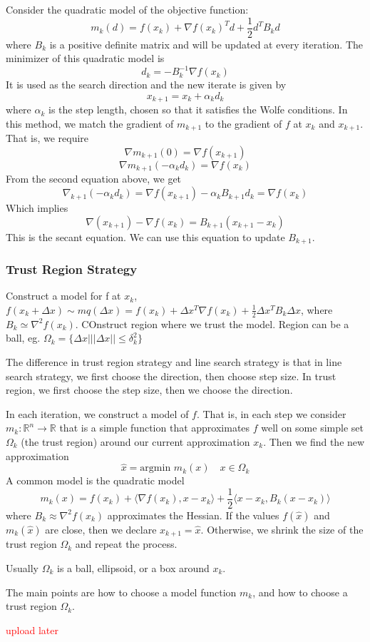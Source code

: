 Consider the quadratic model of the objective function:
$$m_k(d) = f(x_k) + \nabla f(x_k)^T d + \frac{1}{2} d^T B_k d$$
where $B_k$ is a positive definite matrix and will be updated at every iteration. The minimizer of this quadratic model is $$d_k = -B_k^{-1} \nabla f(x_k)$$
It is used as the search direction and the new iterate is given by $$x_{k+1} = x_k + \alpha_k d_k$$
where $\alpha_k$ is the step length, chosen so that it satisfies the Wolfe conditions. In this method, we match the gradient of $m_{k+1}$ to the gradient of $f$ at $x_k$ and $x_{k+1}$. That is, we require
$$\nabla m_{k+1}(0) = \nabla f(x_{k+1})$$
$$\nabla m_{k+1}(-\alpha_k d_k) = \nabla f(x_k)$$
From the second equation above, we get
$$\nabla_{k+1}(-\alpha_k d_k) = \nabla f(x_{k+1}) - \alpha_k B_{k+1} d_k = \nabla f(x_k)$$
Which implies
$$\nabla(x_{k+1}) - \nabla f(x_k) = B_{k+1}(x_{k+1} - x_k)$$
This is the secant equation. We can use this equation to update $B_{k+1}$.



\subsubsection{Trust Region Strategy}
\begin{problem}
  Construct a model for f at $x_k$, $f(x_k+\Delta x)\sim mq(\Delta x)=f(x_k)+\Delta x^T\nabla f(x_k)+\frac{1}{2}\Delta x^TB_k\Delta x$,
  where $B_k\simeq \nabla^2 f(x_k)$. COnstruct region where we trust the model. Region can be a ball,
  eg. $\Omega_k=\{\Delta x| ||\Delta x||\leq \delta_k^2\}$
\end{problem}
The difference in trust region strategy and line search strategy is that in line search strategy, we first choose the direction, then choose step size. In trust region, we first choose the step size, then we choose the direction.
\begin{definition}
  In each iteration, we construct a model of $f$. That is, in each step we consider $m_k: \mathbb R^n \to \mathbb R$ that is a simple function that approximates $f$ well on some simple set $\Omega_k$ (the trust region) around our current approximation $x_k$. Then we find the new approximation $$\hat x = \text{argmin } m_k(x) \quad \text{$x \in \Omega_k$}$$
  A common model is the quadratic model $$m_k(x) = f(x_k) + \langle \nabla f(x_k), x - x_k \rangle + \frac{1}{2} \langle x - x_k, B_k(x - x_k) \rangle$$ where $B_k \approx \nabla^2 f(x_k)$ approximates the Hessian. If the values $f(\hat x)$ and $m_k(\hat x)$ are close, then we declare $x_{k+1} = \hat x$. Otherwise, we shrink the size of the trust region $\Omega_k$ and repeat the process.

  Usually $\Omega_k$ is a ball, ellipsoid, or a box around $x_k$.

  The main points are how to choose a model function $m_k$, and how to choose a trust region $\Omega_k$.
\end{definition}


\begin{definition}
  \textcolor{red}{upload later}
\end{definition}
